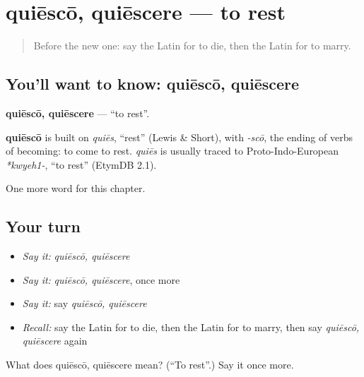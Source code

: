 \section[quiēscō, quiēscere]{quiēscō, quiēscere — to rest}

\label{lesson:LA-C198-quiesco}



\begin{quote}
Before the new one: say the Latin for to die, then the Latin for to marry.
\end{quote}

\subsection*{You'll want to know: quiēscō, quiēscere}
\textbf{quiēscō, quiēscere} — \textquotedblleft{}to rest\textquotedblright{}.

\begin{cousinweb}
\textbf{quiēscō} is built on \emph{quiēs}, \textquotedblleft{}rest\textquotedblright{} (Lewis \& Short), with \emph{-scō}, the ending of verbs of becoming: to come to rest. \emph{quiēs} is usually traced to Proto-Indo-European \emph{*kwyeh1-}, \textquotedblleft{}to rest\textquotedblright{} (EtymDB 2.1).
\end{cousinweb}

\begin{grammarlens}[title={What you've built}]
One more word for this chapter.
\end{grammarlens}

\subsection*{Your turn}
\begin{itemize}
\raggedright
  \item \emph{Say it:} \emph{quiēscō, quiēscere}
  \item \emph{Say it:} \emph{quiēscō, quiēscere}, once more
  \item \emph{Say it:} say \emph{quiēscō, quiēscere}
  \item \emph{Recall:} say the Latin for to die, then the Latin for to marry, then say \emph{quiēscō, quiēscere} again
\end{itemize}

\begin{tcolorbox}[breakable,colback=teal!4,colframe=teal!35!black,title={Before you move on}]
What does quiēscō, quiēscere mean? (\textquotedblleft{}To rest\textquotedblright{}.) Say it once more.
\end{tcolorbox}
